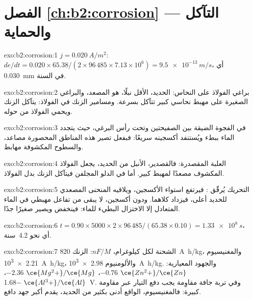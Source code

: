 \section*{الفصل \ref{ch:b2:corrosion} --- التآكل والحماية}

\begin{solution}{exo:b2:corrosion:1}
$j = \qty{0.020}{A/m^2}$: $de/dt = 0.020 \times 65.38/(2 \times 96\,485 \times 7.13
\times 10^6) = \qty{9.5e-13}{m/s}$، أي \qty{0.030}{mm} في السنة.
\end{solution}

\begin{solution}{exo:b2:corrosion:2}
براغي الفولاذ على النحاس: الحديد، الأقل نبلًا، هو المصعد، والبراغي الصغيرة
على مهبط نحاسي كبير تتآكل بسرعة. ومسامير الزنك في الفولاذ: يتآكل الزنك
ويحمي الفولاذ من حوله.
\end{solution}

\begin{solution}{exo:b2:corrosion:3}
في الفجوة الضيقة بين الصفيحتين وتحت رأس البرغي، حيث يتجدد الماء
ببطء ويُستنفد أكسجينه سريعًا: فبفعل 
تصير هذه المناطق المحصورة مصاعد، والسطوح المكشوفة مهابط.
\end{solution}

\begin{solution}{exo:b2:corrosion:4}
العلبة المقصدرة: فالقصدير، الأنبل من الحديد، يجعل الفولاذ المكشوف مصعدًا لمهبط
كبير. أما في الدلو المجلفن فيتآكل الزنك بدل
الفولاذ.
\end{solution}

\begin{solution}{exo:b2:corrosion:5}
التحريك يُرقّق : فيرتفع استواء الأكسجين، ويلاقيه المنحنى المصعدي
للحديد أعلى، فيزداد  
كلاهما. ودون أكسجين، لا يبقى من تفاعل مهبطي في الماء
المتعادل إلا الاختزال البطيء للماء: فينخفض  ويصير
 صغيرًا جدًا.
\end{solution}

\begin{solution}{exo:b2:corrosion:6}
$t = 0.90 \times 5000 \times 2 \times 96\,485/(65.38 \times 0.10) = \qty{1.33e8}{s}$،
أي نحو 4.2~سنة.
\end{solution}

\begin{solution}{exo:b2:corrosion:7}
الشحنة لكل كيلوغرام، $nF/M$: الزنك \qty{820}{A.h/kg}، والمغنيسيوم \qty{2.21e3}{A.h/kg}،
والألومنيوم \qty{2.98e3}{A.h/kg}. والجهود المعيارية: $\ce{Zn^2+}/\ce{Zn}$ $-0.76$،
$\ce{Mg^2+}/\ce{Mg}$ $-2.36$، $\ce{Al^3+}/\ce{Al}$ \qty{-1.68}{V}. وفي تربة جافة مقاوِمة
يجب دفع التيار عبر مقاومة كبيرة: فالمغنيسيوم، الواقع أدنى بكثير
من الحديد، يقدم أكبر جهد دافع.
\end{solution}

